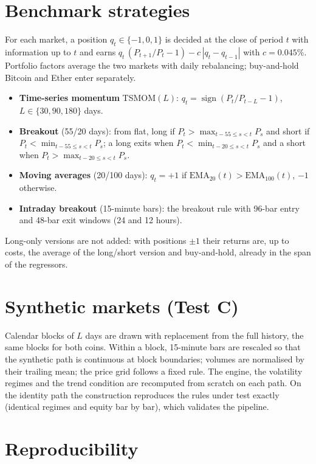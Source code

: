 \documentclass[11pt,a4paper]{article}
\newcommand{\1}{\mathbf{1}}
\begin{document}
\clearpage
\appendix
\section{Benchmark strategies}\label{app:bench}

For each market, a position $q_t\in\{-1,0,1\}$ is decided at the close of period $t$ with information up to $t$ and earns $q_t\,(P_{t+1}/P_t-1)-c\,|q_t-q_{t-1}|$ with $c=0.045\%$. Portfolio factors average the two markets with daily rebalancing; buy-and-hold Bitcoin and Ether enter separately.
\begin{itemize}
\item \textbf{Time-series momentum} TSMOM$(L)$: $q_t=\operatorname{sign}(P_t/P_{t-L}-1)$, $L\in\{30,90,180\}$ days.
\item \textbf{Breakout} (55/20 days): from flat, long if $P_t>\max_{t-55\le s<t}P_s$ and short if $P_t<\min_{t-55\le s<t}P_s$; a long exits when $P_t<\min_{t-20\le s<t}P_s$ and a short when $P_t>\max_{t-20\le s<t}P_s$.
\item \textbf{Moving averages} (20/100 days): $q_t=+1$ if $\mathrm{EMA}_{20}(t)>\mathrm{EMA}_{100}(t)$, $-1$ otherwise.
\item \textbf{Intraday breakout} (15-minute bars): the breakout rule with 96-bar entry and 48-bar exit windows (24 and 12 hours).
\end{itemize}
Long-only versions are not added: with positions $\pm1$ their returns are, up to costs, the average of the long/short version and buy-and-hold, already in the span of the regressors.

\section{Synthetic markets (Test C)}

Calendar blocks of $L$ days are drawn with replacement from the full history, the same blocks for both coins. Within a block, 15-minute bars are rescaled so that the synthetic path is continuous at block boundaries; volumes are normalised by their trailing mean; the price grid follows a fixed rule. The engine, the volatility regimes and the trend condition are recomputed from scratch on each path. On the identity path the construction reproduces the rules under test exactly (identical regimes and equity bar by bar), which validates the pipeline.

\section{Reproducibility}
\end{document}
